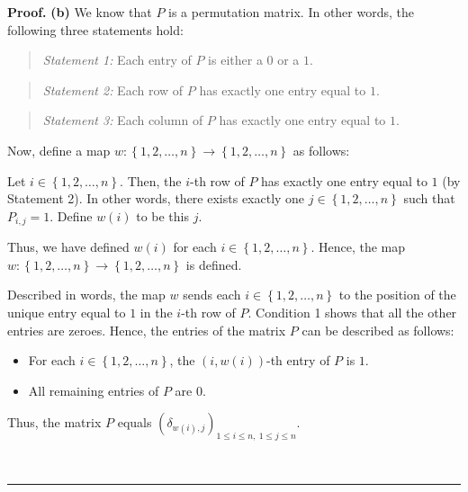 \documentclass[numbers=enddot,12pt,final,onecolumn,notitlepage]{scrartcl}%
\theoremstyle{definition}
\newenvironment{statement}{\begin{quote}}{\end{quote}}
\newenvironment{proof}[1][Proof]{\noindent\textbf{#1.} }{\ \rule{0.5em}{0.5em}}
\begin{document}
\begin{proof}
\textbf{(b)} We know that $P$ is a permutation matrix. In other words, the
following three statements hold:

\begin{statement}
\textit{Statement 1:} Each entry of $P$ is either a $0$ or a $1$.
\end{statement}

\begin{statement}
\textit{Statement 2:} Each row of $P$ has exactly one entry equal to $1$.
\end{statement}

\begin{statement}
\textit{Statement 3:} Each column of $P$ has exactly one entry equal to $1$.
\end{statement}

Now, define a map $w:\left\{  1,2,\ldots,n\right\}  \rightarrow\left\{
1,2,\ldots,n\right\}  $ as follows:

Let $i\in\left\{  1,2,\ldots,n\right\}  $. Then, the $i$-th row of $P$ has
exactly one entry equal to $1$ (by Statement 2). In other words, there exists
exactly one $j\in\left\{  1,2,\ldots,n\right\}  $ such that $P_{i,j}=1$.
Define $w\left(  i\right)  $ to be this $j$.

Thus, we have defined $w\left(  i\right)  $ for each $i\in\left\{
1,2,\ldots,n\right\}  $. Hence, the map $w:\left\{  1,2,\ldots,n\right\}
\rightarrow\left\{  1,2,\ldots,n\right\}  $ is defined.

Described in words, the map $w$ sends each $i\in\left\{  1,2,\ldots,n\right\}
$ to the position of the unique entry equal to $1$ in the $i$-th row of $P$.
Condition 1 shows that all the other entries are zeroes. Hence, the entries of
the matrix $P$ can be described as follows:

\begin{itemize}
\item For each $i\in\left\{  1,2,\ldots,n\right\}  $, the $\left(  i,w\left(
i\right)  \right)  $-th entry of $P$ is $1$.

\item All remaining entries of $P$ are $0$.
\end{itemize}

Thus, the matrix $P$ equals $\left(  \delta_{w\left(  i\right)  ,j}\right)
_{1\leq i\leq n,\ 1\leq j\leq n}$.


\end{proof}
\end{document}

